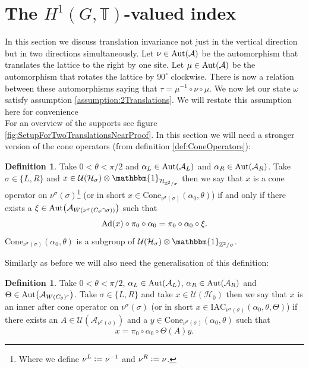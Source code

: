 \documentclass[12pt,a4paper,twoside]{article}
\newcommand{\IAC}{\textrm{IAC}}
\newcommand{\defeq}{\vcentcolon=}
\let\originalleft\left
\let\originalright\right
\renewcommand{\left}{\mathopen{}\mathclose\bgroup\originalleft}
\renewcommand{\right}{\aftergroup\egroup\originalright}
\newcommand{\UU}{\mathcal U}
\newcommand{\HH}{\mathcal H}
\newcommand{\ZZ}{\mathbb Z}
\newcommand{\TT}{\mathbb T}
\renewcommand{\AA}{\mathcal A}
\newcommand{\id}{\mathbbm{1}}
\newcommand{\Ad}[1]{\textrm{Ad}\left(#1\right)}
\newcommand{\Aut}[1]{\textrm{Aut}\left(#1\right)}
\theoremstyle{definition}
\newtheorem{definition}[theorem]{Definition}
\numberwithin{equation}{section}
\begin{document}
\section{The $H^1(G,\TT)$-valued index}\label{sec:TwoDirectionTraslationInvariance}
In this section we discuss translation invariance not just in the vertical direction but in two directions simultaneously. Let $\nu\in\Aut{\AA}$ be the automorphism that translates the lattice to the right by one site. Let $\mu\in\Aut{\AA}$ be the automorphism that rotates the lattice by $90^\circ$ clockwise. There is now a relation between these automorphisms saying that $\tau=\mu^{-1}\circ\nu\circ\mu$. We now let our state $\omega$ satisfy assumption \ref{assumption:2Translations}. We will restate this assumption here for convenience
\assumptionTwo*$\:$\\
For an overview of the supports see figure \ref{fig:SetupForTwoTranslationsNearProof}. In this section we will need a stronger version of the cone operators (from definition \ref{def:ConeOperators}):
\begin{definition}
	Take $0<\theta<\pi/2$ and $\alpha_L\in\Aut{\AA_{L}}$ and $\alpha_R\in\Aut{\AA_{R}}$. Take $\sigma\in\{L,R\}$ and $x\in\UU(\HH_{\sigma})\otimes\id_{\HH_{\ZZ^2/\sigma}}$ then we say that $x$ is a cone operator on $\nu^\sigma(\sigma)$\footnote{Where we define $\nu^L\defeq \nu^{-1}$ and $\nu^R\defeq \nu$.} (or in short $x\in\textrm{Cone}_{\nu^\sigma(\sigma)}(\alpha_0,\theta)$) if and only if there exists a $\xi\in\Aut{\AA_{W(\nu^\sigma(C_\theta\cap\sigma))}}$ such that
	\begin{equation}
		\Ad{x}\circ\pi_0\circ\alpha_0=\pi_0\circ\alpha_0\circ\xi.
	\end{equation}
	$\textrm{Cone}_{\nu^\sigma(\sigma)}(\alpha_0,\theta)$ is a subgroup of $\UU(\HH_\sigma)\otimes\id_{\ZZ^2/\sigma}$.
\end{definition}
Similarly as before we will also need the generalisation of this definition:
\begin{definition}
	Take $0<\theta<\pi/2$, $\alpha_L\in\Aut{\AA_{L}}$, $\alpha_R\in\Aut{\AA_{R}}$ and $\Theta\in\Aut{\AA_{W(C_\theta)^c}}$. Take $\sigma\in\{L,R\}$ and take $x\in\UU(\HH_0)$ then we say that $x$ is an inner after cone operator on $\nu^\sigma(\sigma)$ (or in short $x\in \IAC_{\nu^\sigma(\sigma)}(\alpha_0,\theta,\Theta)$) if there exists an $A\in\UU(\AA_{\nu^\sigma(\sigma)})$ and a $y\in\textrm{Cone}_{\nu^\sigma(\sigma)}(\alpha_0,\theta)$ such that
	\begin{equation}
		x=\pi_0\circ\alpha_0\circ\Theta(A)y.
	\end{equation}
\end{definition}
\end{document}
